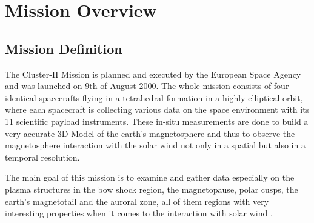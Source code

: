 \section{Mission Overview}

\subsection{Mission Definition}
The Cluster-II Mission is planned and executed by the European Space Agency and was launched on 9th of August 2000. The whole mission consists of four identical spacecrafts flying in a tetrahedral formation in a highly elliptical orbit, where each spacecraft is collecting various data on the space environment with its 11 scientific payload instruments. These in-situ measurements are done to build a very accurate 3D-Model of the earth's magnetosphere and thus to observe the magnetosphere interaction with the solar wind not only in a spatial but also in a temporal resolution.

The main goal of this mission is to examine and gather data especially on the plasma structures in the bow shock region, the magnetopause, polar cusps, the earth's magnetotail and the auroral zone, all of them regions with very interesting properties when it comes to the interaction with solar wind \citep{ESA:clusterWebsite}.

